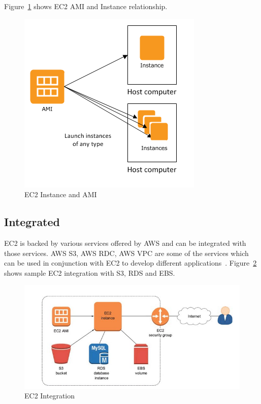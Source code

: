 Figure~\ref{f:ec2-ami-instance} shows EC2 AMI and Instance
relationship.
\begin{figure}[!ht]
  \centering\includegraphics[width=\columnwidth]
{images/ec2AMI.PNG} \caption{EC2
  Instance and
  AMI~\cite{hid-sp18-402-www-aws-ec2instance}}
\label{f:ec2-ami-instance}
\end{figure}

\subsection{Integrated}
EC2 is backed by various services offered by AWS and can be integrated
with those services. AWS S3, AWS RDC, AWS VPC are some of the services
which can be used in conjunction with EC2 to develop different
applications~\cite{hid-sp18-402-www-aws-ec2}.
Figure~\ref{f:ec2-integration} shows sample EC2 integration with S3,
RDS and EBS.
\begin{figure}[!ht]
  \centering\includegraphics[width=\columnwidth]
{images/ec2Integration.PNG} \caption{EC2
  Integration~\cite{hid-sp18-402-www-medium-aws}}
\label{f:ec2-integration}
\end{figure}

